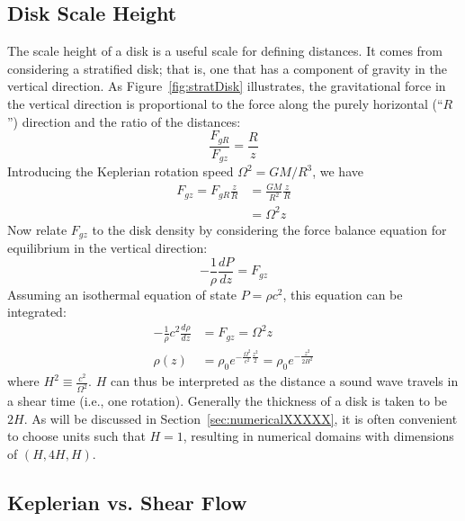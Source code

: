 \subsection{Disk Scale Height}
The scale height of a disk is a useful scale for defining distances. It comes from considering a stratified disk; that is, one that has a component of gravity in the vertical direction. As Figure~\ref{fig:stratDisk} illustrates, the gravitational force in the vertical direction is proportional to the force along the purely horizontal (``$R$'') direction and the ratio of the distances:
\begin{equation}
\frac{F_{gR}}{F_{gz}}=\frac{R}{z}
\end{equation}
Introducing the Keplerian rotation speed $\Omega^2=GM/R^3$, we have  
\begin{align*}
F_{gz}=F_{gR}\frac z R&=\frac{GM}{R^2}\frac zR\\
&=\Omega^2 z
\end{align*}
Now relate $F_{gz}$ to the disk density by considering the force balance equation for equilibrium in the vertical direction:
\begin{equation*}
-\frac1\rho\frac{dP}{dz}=F_{gz}
\end{equation*}
Assuming an isothermal equation of state $P=\rho c^2$, this equation can be integrated:
\begin{align*}
-\frac1\rho c^2\frac{d\rho}{dz}&=F_{gz}=\Omega^2z\\
\rho(z)&=\rho_0 e^{-\frac{\Omega^2}{c^2}\frac{z^2}2}=\rho_0e^{-\frac{z^2}{2H^2}}
\end{align*}
where $H^2\equiv\frac{c^2}{\Omega^2}$. $H$ can thus be interpreted as the distance a sound wave travels in a shear time (i.e., one rotation). Generally the thickness of a disk is taken to be $2H$. As will be discussed in Section~\ref{sec:numericalXXXXX}, it is often convenient to choose units such that $H=1$, resulting in numerical domains with dimensions of $(H,4H,H)$. 



\subsection{Keplerian vs. Shear Flow}

